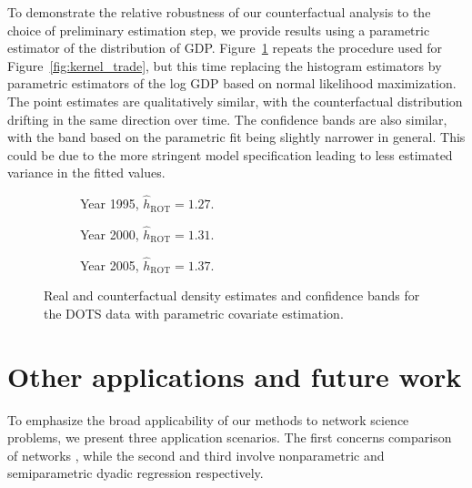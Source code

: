 \documentclass[11pt,lof]{puthesis}
\DeclareMathOperator{\ROT}{ROT}
\theoremstyle{break}
\theoremstyle{proof}
\begin{document}
To demonstrate the relative robustness of our counterfactual analysis to the
choice of preliminary estimation step, we provide results using a
parametric estimator of the distribution of GDP.
Figure~\ref{fig:kernel_trade_para}
repeats the procedure used for Figure~\ref{fig:kernel_trade}, but this time
replacing the histogram estimators by parametric estimators of the log GDP based
on normal likelihood maximization. The point estimates are qualitatively
similar, with the counterfactual distribution drifting in the same direction
over time.
The confidence bands are also similar, with the band based on the parametric
fit being slightly narrower in general. This could be due to the more stringent
model specification leading to less estimated variance in the fitted values.

\begin{figure}[t]
  \centering
  \begin{subfigure}{0.32\textwidth}
    \centering
    \caption{Year 1995, $\hat h_{\ROT} = 1.27$.}
  \end{subfigure}
  \begin{subfigure}{0.32\textwidth}
    \centering
    \caption{Year 2000, $\hat h_{\ROT} = 1.31$.}
  \end{subfigure}
  \begin{subfigure}{0.32\textwidth}
    \centering
    \caption{Year 2005, $\hat h_{\ROT} = 1.37$.}
  \end{subfigure}
  \caption[Parametric likelihood-based estimation and
  inference for the DOTS data]{
    Real and counterfactual density estimates and confidence bands for
  the DOTS data with parametric covariate estimation.}
  \label{fig:kernel_trade_para}
\end{figure}

\section{Other applications and future work}
\label{sec:kernel_future}

To emphasize the broad applicability of our methods to network science
problems, we present three application scenarios. The first concerns comparison
of networks \citep{kolaczyk2009statistical}, while the second and third involve
nonparametric and semiparametric dyadic regression respectively.
\end{document}
